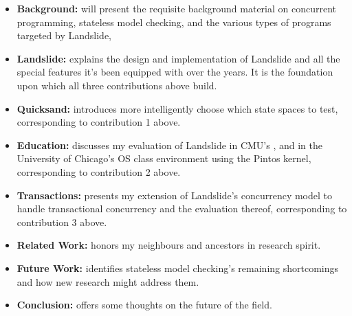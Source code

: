 \begin{itemize}
	\item {\bf Background:}  will present the requisite background material on concurrent programming, stateless model checking, and the various types of programs targeted by Landslide,
	\item {\bf Landslide:}  explains the design and implementation of Landslide
		and all the special features it's been equipped with over the years.
		It is the foundation upon which all three contributions above build.
	\item {\bf Quicksand:}  introduces
		more intelligently choose which state spaces to test, corresponding to contribution 1 above.
	\item {\bf Education:}  discusses my evaluation of Landslide
		in CMU's
		,
		and in the University of Chicago's
		OS class environment using the Pintos kernel,
		corresponding to contribution 2 above.
	\item {\bf Transactions:}  presents my extension of Landslide's concurrency model to handle transactional concurrency and the evaluation thereof, corresponding to contribution 3 above.
	\item {\bf Related Work:}  honors my neighbours and ancestors in research spirit.
	\item {\bf Future Work:}  identifies stateless model checking's remaining shortcomings and how new research might address them.
	\item {\bf Conclusion:}  offers some thoughts on the future of the field.
\end{itemize}

